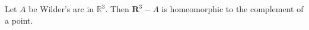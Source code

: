 Let $A$ be Wilder's arc in $\mathbb{R}^3$. Then $\mathbf{R}^3 - A$ is homeomorphic to the complement of a point.
